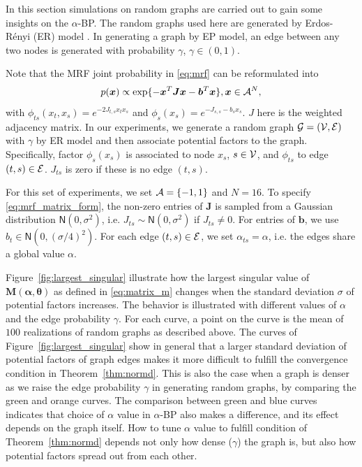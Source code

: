 In this section simulations on random graphs are carried out
to gain some insights on the $\alpha$-BP. The random graphs used here are generated
by Erdos-R\'enyi (ER) model \cite{erdos1960}. In generating a graph by EP model, an edge between any two nodes is generated with probability $\gamma$, $\gamma \in (0,1)$.

Note that the MRF joint probability in \eqref{eq:mrf} can be reformulated into
\begin{equation}\label{eq:mrf_matrix_form}
  p(\bm{x}) \propto \exp\{-\bm{x}^{T}\bm{J}\bm{x} - \bm{b}^{T}\bm{x}\}, \bm{x} \in \mathcal{A}^N,
\end{equation}
with $\phi_{ts}(x_t, x_s) = e^{- 2 J_{t,s} x_t x_s}$ and $\phi_s(x_s) = e^{ - J_{s,s} - b_s  x_s}$. $J$ here is the weighted adjacency matrix. In our experiments, we generate a random graph $\mathcal{G} = (\mathcal{V}, \mathcal{E})$ with $\gamma$ by ER model and then associate potential factors to the graph. Specifically, factor $\phi_s(x_s)$ is associated to node $x_s$, $s \in \mathcal{V}$, and $\phi_{ts}$ to edge $(t, s) \in \mathcal{E}$. $J_{ts}$ is zero if these is no edge $(t, s)$.

For this set of experiments, we set $\mathcal{A} = \left\{ -1, 1 \right\}$ and $N=16$. To specify \eqref{eq:mrf_matrix_form}, the non-zero entries of $\bm{J}$ is sampled from a Gaussian distribution $\mathsf{N}(0, \sigma^2)$, i.e. $J_{ts} \sim \mathsf{N}(0, \sigma^2)$ if $J_{ts}\neq 0$. For entries of $\bm{b}$, we use $b_t \in \mathsf{N}(0, (\sigma/4)^2)$.
For each edge $(t,s) \in \mathcal{E}$, we set $\alpha_{ts}=\alpha$, i.e. the edges share a global value $\alpha$.

Figure~\ref{fig:largest_singular} illustrate how the largest singular value of $\bm{M}(\bm{\alpha}, \bm{\theta})$ as defined in \eqref{eq:matrix_m} changes when the standard deviation $\sigma$ of potential factors increases. The behavior is illustrated with different values of $\alpha$ and the edge probability $\gamma$. For each curve, a point on the curve is the mean of $100$ realizations of random graphs as described above. The curves of Figure~\ref{fig:largest_singular} show in general that a larger standard deviation of potential factors of graph edges makes it more difficult to fulfill the convergence condition in Theorem~\ref{thm:normd}. This is also the case when a graph is denser as we raise the edge probability $\gamma$ in generating random graphs, by comparing the green and orange curves. The comparison between green and blue curves indicates that choice of $\alpha$ value in $\alpha$-BP also makes a difference, and its effect depends on the graph itself. How to tune $\alpha$ value to fulfill condition of Theorem~\ref{thm:normd} depends not only how dense ($\gamma$) the graph is, but also how potential factors spread out from each other.

